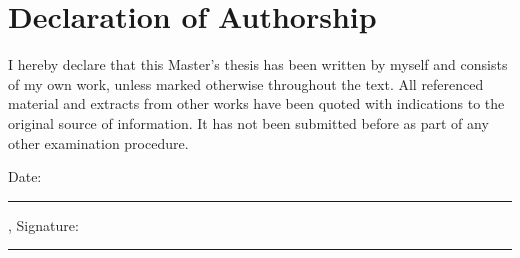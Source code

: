 \newpage
\thispagestyle{empty}
\section*{Declaration of Authorship}

I hereby declare that this Master's thesis has been written by myself and consists of my own
work, unless marked otherwise throughout the text. All referenced material and extracts
from other works have been quoted with indications to the original source of information.
It has not been submitted before as part of any other examination procedure.


\vspace{3 cm}

Date: \rule{4cm}{.4pt},
Signature: \rule{4cm}{.4pt}